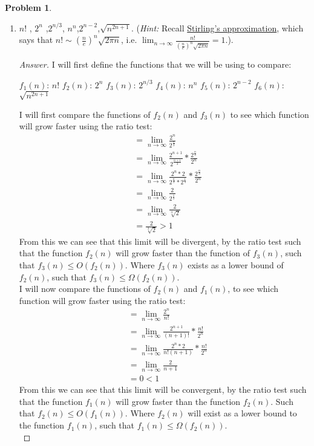 \documentclass[11pt]{article}
\theoremstyle{definition}
\theoremstyle{definition}
\newtheorem{required}{Problem}
\theoremstyle{definition}
\begin{document}
\begin{required}
\begin{enumerate}[label=(\alph*)]
\subsection{Problem 13\ref{2b}}
        \item \label{2b} $n!$ , \qquad $2^n$ ,\qquad  $2^{n/3}$, \qquad  $n^n$,\qquad $2^{n-2}$,\qquad  $\sqrt{n^{2n+1}}$. (\emph{Hint:} Recall \href{https://en.wikipedia.org/wiki/Stirling\%27s_approximation}{Stirling's approximation}, which says that $n! \sim \left(\frac{n}{e}\right)^n \sqrt{2 \pi n}$, i.e. $\lim_{n \to \infty} \frac{n!}{\left(\frac{n}{e}\right)^n \sqrt{2 \pi n}} = 1$.).
\begin{proof}[Answer]
I will first define the functions that we will be using to compare: \\
\begin{center}
$f_1(n)$: $n!$
$f_2(n)$: $2^n$
$f_3(n)$: $2^{n/3}$
$f_4(n)$: $n^n$
$f_5(n)$: $2^{n-2}$
$f_6(n)$: $\sqrt{n^{2n+1}}$   
\end{center}
I will first compare the functions of $f_2(n)$ and $f_3(n)$ to see which function will grow faster using the ratio test: \\
\begin{align*}
&= \lim_{n \to \infty} \frac{2^{n}}{2^{\frac{n}{3}}} \\
&= \lim_{n \to \infty} \frac{2^{n + 1}}{2^{\frac{n+1}{3}}} * \frac{2^{\frac{n}{3}}}{2^{n}} \\
&= \lim_{n \to \infty} \frac{2^{n} * 2} {2^{\frac{n}{3}} * 2^{\frac{1}{3}}} * \frac{2^{\frac{n}{3}}}{2^{n}} \\
&= \lim_{n \to \infty} \frac{2}{2^{\frac{1}{3}}} \\
&= \lim_{n \to \infty} \frac{2}{\sqrt[3]2} \\
&= \frac{2}{\sqrt[3]2} > 1
\end{align*} 
From this we can see that this limit will be divergent, by the ratio test such that the function $f_2(n)$ will grow faster than the function of $f_3(n)$, such that $f_3(n) \leq O(f_2(n))$. Where $f_3(n)$ exists as a lower bound of $f_2(n)$, such that $f_3(n) \leq \Omega(f_2(n))$. \\

I will now compare the functions of $f_2(n)$ and $f_1(n)$, to see which function will grow faster using the ratio test: \\
\begin{align*}
&= \lim_{n \to \infty} \frac{2^{n}}{n!} \\
&= \lim_{n \to \infty} \frac{2^{n+1}}{(n+1)!} * \frac{n!}{2^{n}} \\
&= \lim_{n \to \infty} \frac{2^{n} * 2}{n!(n+1)} * \frac{n!}{2^{n}} \\
&= \lim_{n \to \infty} \frac{2}{n+1}\\
&= 0 < 1
\end{align*} 
From this we can see that this limit will be convergent, by the ratio test such that the function $f_1(n)$  will grow faster than the function $f_2(n)$. Such that $f_2(n) \leq O(f_1(n))$. Where $f_2(n)$ will exist as a lower bound to the function $f_1(n)$, such that $f_1(n) \leq \Omega(f_2(n))$. \\


\end{proof}
\end{enumerate}
\end{required}
\end{document}

